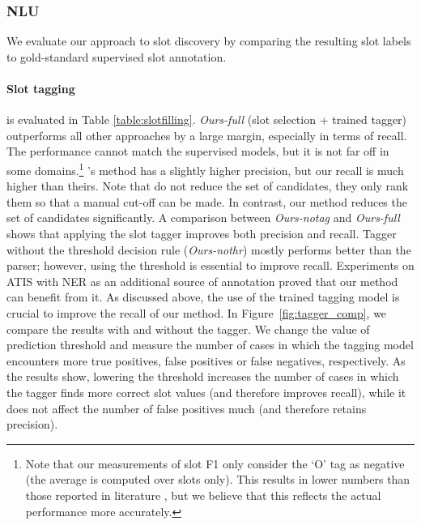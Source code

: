 \subsubsection{NLU}
We evaluate our approach to slot discovery by comparing the resulting slot labels to gold-standard supervised slot annotation.
\paragraph{Slot tagging}\hspace{-3mm} is evaluated in Table \ref{table:slotfilling}.
\emph{Ours-full} (slot selection + trained tagger) outperforms all other approaches by a large margin, especially in terms of recall.
The performance cannot match the supervised models, but it is not far off in some domains.\footnote{Note that our measurements of slot F1 only consider the `O' tag as negative (the average is computed over slots only). This results in lower numbers than those reported in literature \cite[cf.~e.g.][]{goo_slot-gated_2018}, but we believe that this reflects the actual performance more accurately.}
\citet{chen2014leveraging}'s method has a slightly higher precision, but our recall is much higher than theirs.
Note that \citet{chen2014leveraging} do not reduce the set of candidates, they only rank them so that a manual cut-off can be made.
In contrast, our method reduces the set of candidates significantly.
A comparison between \textit{Ours-notag} and \textit{Ours-full} shows that applying the slot tagger improves both precision and recall.
Tagger without the threshold decision rule (\textit{Ours-nothr}) mostly performs better than the parser; however, using the threshold is essential to improve recall.
Experiments on ATIS with NER as an additional source of annotation proved that our method can benefit from it.
As discussed above, the use of the trained tagging model is crucial to improve the recall of our method. In Figure~\ref{fig:tagger_comp}, we compare the results with and without the tagger. We change the value of prediction threshold and measure the number of cases in which the tagging model encounters more true positives, false positives or false negatives, respectively. As the results show, lowering the threshold increases the number of cases in which the tagger finds more correct slot values (and therefore improves recall), while it does not affect the number of false positives much (and therefore retains precision).
